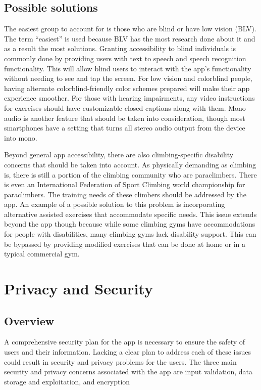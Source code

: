 \documentclass[10pt,twocolumn]{article}
\begin{document}
\subsection{Possible solutions}

The easiest group to account for is those who are blind or have low vision (BLV). The term “easiest” is used because BLV has the most research done about it and as a result the most solutions. \cite{mack_what_2021} Granting accessibility to blind individuals is commonly done by providing users with text to speech and speech recognition functionality. This will allow blind users to interact with the app’s functionality without needing to see and tap the screen. For low vision and colorblind people, having alternate colorblind-friendly color schemes prepared will make their app experience smoother. For those with hearing impairments, any video instructions for exercises should have customizable closed captions along with them. Mono audio is another feature that should be taken into consideration, though most smartphones have a setting that turns all stereo audio output from the device into mono. 
	
Beyond general app accessibility, there are also climbing-specific disability concerns that should be taken into account. As physically demanding as climbing is, there is still a portion of the climbing community who are paraclimbers. There is even an International Federation of Sport Climbing world championship for paraclimbers. \cite{noauthor_climbing_nodate} The training needs of these climbers should be addressed by the app. An example of a possible solution to this problem is incorporating alternative assisted exercises that accommodate specific needs. This issue extends beyond the app though because while some climbing gyms have accommodations for people with disabilities, many climbing gyms lack disability support. This can be bypassed by providing modified exercises that can be done at home or in a typical commercial gym. \cite{noauthor_climbing_nodate}



\section{Privacy and Security}

\subsection{Overview}

	A comprehensive security plan for the app is necessary to ensure the safety of users and their information. Lacking a clear plan to address each of these issues could result in security and privacy problems for the users. The three main security and privacy concerns associated with the app are input validation, data storage and exploitation, and encryption 
\end{document}
